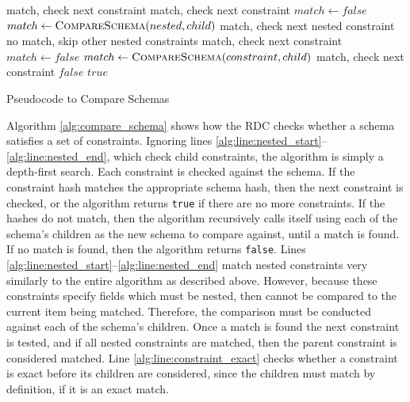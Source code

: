 \documentclass[12pt,twoside,notitlepage]{report}
\begin{document}
\begin{algorithm}
\begin{algorithmic}[1]
			 \label{alg:line:constraint_exact}
				\Continue \Comment match, check next constraint
				\Continue \Comment match, check next constraint
			\Else \label{alg:line:nested_start}
					\State $match\gets false$
						\State $match\gets \Call{CompareSchema}{nested, child}$
							\Continue \Comment match, check next nested constraint
						\EndIf
					\EndFor
						\Break \Comment no match, skip other nested constraints
					\EndIf
				\EndFor
					\Continue \Comment match, check next constraint
				\EndIf
			\EndIf \label{alg:line:nested_end}
		\Else
			\State $match\gets false$
				\State $match\gets \Call{CompareSchema}{constraint, child}$
					\Continue \Comment match, check next constraint
				\EndIf
			\EndFor
				\State \Return $false$
			\EndIf
		\EndIf
	\EndFor
	\State \Return $true$
\EndFunction 
\end{algorithmic}
\caption{Pseudocode to Compare Schemas}
\label{alg:compare_schema}
\end{algorithm}

Algorithm \ref{alg:compare_schema} shows how the RDC checks whether a schema satisfies a set of constraints. 
Ignoring lines \ref{alg:line:nested_start}--\ref{alg:line:nested_end}, which check child constraints, the algorithm is simply a depth-first search. 
Each constraint is checked against the schema. 
If the constraint hash matches the appropriate schema hash, then the next constraint is checked, or the algorithm returns {\tt true} if there are no more constraints. 
If the hashes do not match, then the algorithm recursively calls itself using each of the schema's children as the new schema to compare against, until a match is found. 
If no match is found, then the algorithm returns {\tt false}. 
Lines \ref{alg:line:nested_start}--\ref{alg:line:nested_end} match nested constraints very similarly to the entire algorithm as described above. 
However, because these constraints specify fields which must be nested, then cannot be compared to the current item being matched. 
Therefore, the comparison must be conducted against each of the schema's children. 
Once a match is found the next constraint is tested, and if all nested constraints are matched, then the parent constraint is considered matched. 
Line \ref{alg:line:constraint_exact} checks whether a constraint is exact before its children are considered, since the children must match by definition, if it is an exact match. 
\end{document}
